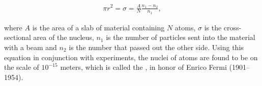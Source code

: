 \begin{align}
 \pi r^2 = \sigma = \frac{A}{N}\frac{n_1-n_2}{n_1},
\end{align}

where $A$ is the area of a slab of material containing $N$ atoms, $\sigma$ is the cross-sectional area of the nucleus, $n_1$ is the number of particles sent into the material with a beam and $n_2$ is the number that passed out the other side. Using this equation in conjunction with experiments, the nuclei of atoms are found to be on the scale of $10^{-15}$ meters, which is called the , in honor of Enrico Fermi (1901–1954).





%






